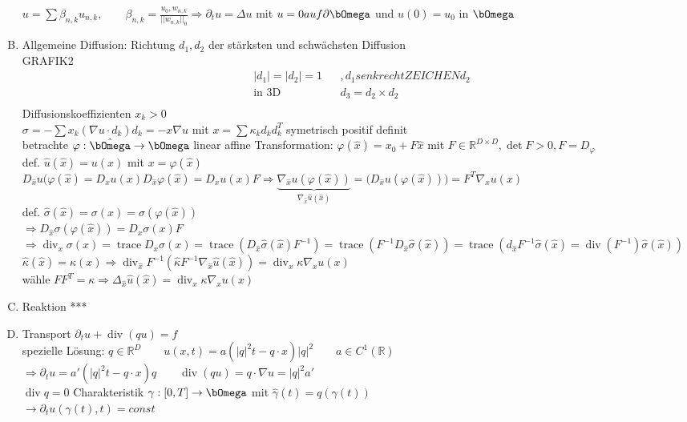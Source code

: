 \documentclass[12pt,twoside,reqno]{article}
\newcommand\tr{\operatorname*{trace}}
\renewcommand\div{\operatorname{div}}
\renewcommand{\Omega}{\bOmega}
\newcommand{\R}{\mathbb{R}}
\theoremstyle{TheoWieners}
\theoremstyle{break}
\theoremstyle{app}
\newtheorem{Spezielle Lösungen}[app]{Spezielle Lösungen}
\newtheorem{Spezielle Lösungen der Poisson-Gleichung}[app]{Spezielle Lösungen der Poisson-Gleichung}
\newtheorem{Kartesische Gitter in 2-d}[app]{Kartesische Gitter in 2-d}
\newtheorem{Diskretisierungen hoher Ordnung}[app]{Diskretisierungen hoher Ordnung}
\newtheorem{Zyklische Reduktion}[app]{Zyklische Reduktion}
\begin{document}
\begin{enumerate}[A)]
   $ u = \sum \beta_{n,k} u_{n,k}, \qquad \beta_{n,k}= \frac{u_0,w_{n,k}}{||w_{n,k}||_0} \Rightarrow \partial_t u =\Delta u$ mit $u=0 auf \partial \Omega$ und $u(0)=u_0$ in $\Omega$
   \item Allgemeine Diffusion: Richtung $d_1, d_2$ der stärksten und schwächsten Diffusion \\ GRAFIK2 \\  
         \begin{align*}
        &|d_1|=|d_2|=1    &&, d_1 senkrechtZEICHEN d_2 \\
        &\text{in 3D}    &&d_3 = d_2 \times d_2 \\
    \end{align*}
    Diffusionskoeffizienten $x_k >0$\\ $\sigma =- \sum x_k ( \nabla u \cdot d_k) d_k = -x \nabla u $ mit $x= \sum \kappa_k d_k d_k^T$ symetrisch positif definit\\ betrachte $\varphi: \hat{\Omega} \rightarrow \Omega$ linear affine Transformation: $\varphi(\hat{x})= x_0 + F \hat{x}$ mit $F\in \R^{D\times D}, \det F >0, F= D_{\varphi}$
   \\ def. $ \hat{u}(\hat{x})=u(x)$ mit $x = \varphi (\hat{x})$ \\
   
 $  D_{\hat{x}} u(\varphi(\hat{x})= D_x u(x) D_{\hat{x}}\varphi(\hat{x})=D_x u(x) F \Rightarrow \underbrace{\nabla_{\hat{x}} u(\varphi(\hat{x}))}_{\nabla_{\hat{x}} \hat{u}(\hat{x})}= \Big( D_{\hat{x}} u(\varphi(\hat{x}))\Big)= F^T \nabla_x u(x)$\\
 def. $\hat{\sigma}(\hat{x})= \sigma(x)= \sigma(\varphi(\hat{x}))$ \\ $\Rightarrow D_{\hat{x}} \sigma (\varphi(\hat{x}))= D_x \sigma(x) F$\\ $\Rightarrow \div_x \sigma(x)= \tr D_x \sigma(x)= \tr (D_{\hat{x}}\hat{\sigma} (\hat{x}) F^{-1}) = \tr (F^{-1} D_{\hat{x}} \hat{\sigma}(\hat{x}))= \tr (d_{\hat{x}}F^{-1} \hat{\sigma}(\hat{x}) = \div(F^{-1})\hat{\sigma}(\hat{x})) $ \\
 $\hat{\kappa}(\hat{x})= \kappa (x) \Rightarrow \div_ {\hat{x}} F^{-1}(\hat{\kappa}F^{-1} \nabla_{\hat{x}} \hat{u}(\hat{x}) ) = \div_x \kappa \nabla_x u(x)$\\
 wähle $FF^T= \kappa \Rightarrow \Delta_{\hat{x}} \hat{u}(\hat{x}) = \div_x \kappa \nabla_x u (x) $
 \item Reaktion ***
 \item Transport $\partial_t u + \div(qu)=f$
\\ spezielle Lösung: $q \in \R^D \qquad u(x,t) = a(|q|^2t-q\cdot x) |q|^2 \qquad a \in C^1(\R)$\\
$\Rightarrow \partial_t u = a'(|q|^2t-q\cdot x) q \qquad \div(qu) = q \cdot \nabla u = |q|^2 a' $\\ $\div q=0$ Charakteristik $\gamma: [0,T] \rightarrow \Omega$ mit $\hat{\gamma}(t)=q(\gamma(t))$ \\ $\rightarrow \partial_t u(\gamma(t),t)=const$
   
   
          \end{enumerate}




          
          
\newpage


%
%
%
%
% 
% 
%
%

\clearpage
\end{document}
